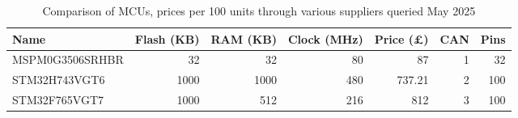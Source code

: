 \begin{table}[h]
  \centering
  \begin{tabular}{lrrrrrr}
    \toprule
    \textbf{Name} & \textbf{Flash (KB)} & \textbf{RAM (KB)} & \textbf{Clock (MHz)} & \textbf{Price (£)} & \textbf{CAN} & \textbf{Pins} \\
    \midrule
    MSPM0G3506SRHBR\cite{ti_mspm0g3506srhbr} & 32 & 32 & 80 & 87 & 1 & 32 \\
    STM32H743VGT6\cite{st_stm32h743vg} & 1000 & 1000 & 480 & 737.21 & 2 & 100 \\
    STM32F765VGT7\cite{st_stm32f765vg} & 1000 & 512 & 216 & 812 & 3 & 100 \\
    \bottomrule
  \end{tabular}
  \caption[Comparison of MCUs]{Comparison of MCUs, prices per 100 units through various suppliers queried May 2025}
  \label{tab:mcu-comparison}
\end{table}
